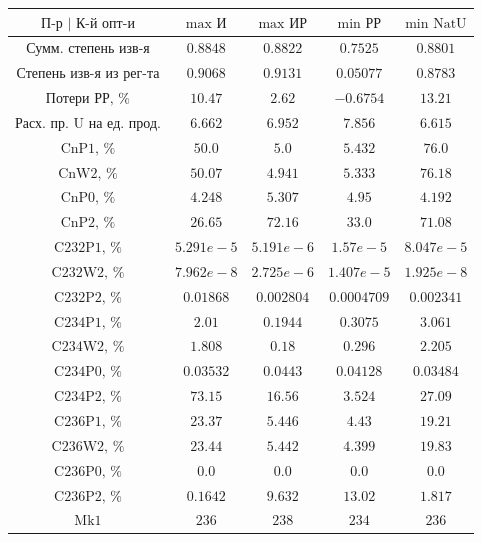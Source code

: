 \begin{table}
    \begin{tabular}{ccccc}
        $\text{П-р | К-й опт-и}$ & $\text{max И}$ & $\text{max ИР}$ & $\text{min РР}$ & $\text{min NatU}$\\ \hline
        $\text{Сумм. степень изв-я}$ & $0.8848$ & $0.8822$ & $0.7525$ & $0.8801$\\ \hline
        $\text{Степень изв-я из рег-та}$ & $0.9068$ & $0.9131$ & $0.05077$ & $0.8783$\\ \hline
        $\text{Потери РР, \%}$ & $10.47$ & $2.62$ & $-0.6754$ & $13.21$\\ \hline
        $\text{Расх. пр. U на ед. прод.}$ & $6.662$ & $6.952$ & $7.856$ & $6.615$\\ \hline
        $\text{CnP1, \%}$ & $50.0$ & $5.0$ & $5.432$ & $76.0$\\ \hline
        $\text{CnW2, \%}$ & $50.07$ & $4.941$ & $5.333$ & $76.18$\\ \hline
        $\text{CnP0, \%}$ & $4.248$ & $5.307$ & $4.95$ & $4.192$\\ \hline
        $\text{CnP2, \%}$ & $26.65$ & $72.16$ & $33.0$ & $71.08$\\ \hline
        $\text{C232P1, \%}$ & $5.291e-5$ & $5.191e-6$ & $1.57e-5$ & $8.047e-5$\\ \hline
        $\text{C232W2, \%}$ & $7.962e-8$ & $2.725e-6$ & $1.407e-5$ & $1.925e-8$\\ \hline
        $\text{C232P2, \%}$ & $0.01868$ & $0.002804$ & $0.0004709$ & $0.002341$\\ \hline
        $\text{C234P1, \%}$ & $2.01$ & $0.1944$ & $0.3075$ & $3.061$\\ \hline
        $\text{C234W2, \%}$ & $1.808$ & $0.18$ & $0.296$ & $2.205$\\ \hline
        $\text{C234P0, \%}$ & $0.03532$ & $0.0443$ & $0.04128$ & $0.03484$\\ \hline
        $\text{C234P2, \%}$ & $73.15$ & $16.56$ & $3.524$ & $27.09$\\ \hline
        $\text{C236P1, \%}$ & $23.37$ & $5.446$ & $4.43$ & $19.21$\\ \hline
        $\text{C236W2, \%}$ & $23.44$ & $5.442$ & $4.399$ & $19.83$\\ \hline
        $\text{C236P0, \%}$ & $0.0$ & $0.0$ & $0.0$ & $0.0$\\ \hline
        $\text{C236P2, \%}$ & $0.1642$ & $9.632$ & $13.02$ & $1.817$\\ \hline
        $\text{Mk1}$ & $236$ & $238$ & $234$ & $236$\\ \hline

\end{tabular}
\end{table}

